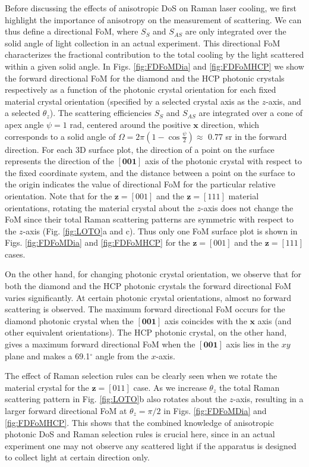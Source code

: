 \documentclass[%
 reprint,
superscriptaddress,
 amsmath,amssymb,
 aps,
pra,
]{revtex4-1}
\newcommand{\mb}[1]{\mathbf{#1}} %
\begin{document}
{Before discussing the effects of anisotropic DoS on Raman laser cooling, we first highlight the importance of anisotropy on the measurement of scattering. We can thus define a directional FoM, where $S_S$ and $S_{AS}$ are only integrated over the solid angle of light collection in an actual experiment. This directional FoM characterizes the fractional contribution to the total cooling by the light scattered within a given solid angle. In Figs.} \ref{fig:FDFoMDia} and \ref{fig:FDFoMHCP} {we show the forward directional FoM for the diamond and the HCP photonic crystals respectively as a function of the photonic crystal orientation for each fixed material crystal orientation (specified by a selected crystal axis as the $z$-axis, and a selected $\theta_z$). The scattering efficiencies $S_S$ and $S_{AS}$ are integrated over a cone of apex angle $\psi=1$ rad, centered around the positive $\mb{x}$ direction, which corresponds to a solid angle of $\Omega=2\pi(1-\cos\frac{\psi}{2})\approx$ 0.77 sr in the forward direction. For each 3D surface plot, the direction of a point on the surface represents the direction of the $[\textbf{001}]$ axis of the photonic crystal with respect to the fixed coordinate system, and the distance between a point on the surface to the origin indicates the value of directional FoM for the particular relative orientation. Note that for the $\mb{z}=[001]$ and the $\mb{z}=[111]$ material orientations, rotating the material crystal about the $z$-axis does not change the FoM since their total Raman scattering patterns are symmetric with respect to the $z$-axis} (Fig. \ref{fig:LOTO}a and c). Thus only one FoM surface plot is shown in Figs. \ref{fig:FDFoMDia} and \ref{fig:FDFoMHCP} for the $\mb{z}=[001]$ and the $\mb{z}=[111]$ cases.






{On the other hand, for changing photonic crystal orientation, we observe that for both the diamond and the HCP photonic crystals the forward directional FoM varies significantly. At certain photonic crystal orientations, almost no forward scattering is observed. The maximum forward directional FoM occurs for the diamond photonic crystal when the $[\textbf{001}]$ axis coincides with the $\mb{x}$ axis (and other equivalent orientations). The HCP photonic crystal, on the other hand, gives a maximum forward directional FoM when the $[\textbf{001}]$ axis lies in the $xy$ plane and makes a 69.1$^\circ$ angle from the $x$-axis.} 


{
The effect of Raman selection rules can be clearly seen when we rotate the material crystal for the $\mb{z}=[011]$ case. As we increase $\theta_z$ the total Raman scattering pattern in Fig.} \ref{fig:LOTO}b also rotates about the $z$-axis, resulting in a larger forward directional FoM at $\theta_z=\pi/2$ in Figs. \ref{fig:FDFoMDia} and \ref{fig:FDFoMHCP}. {This shows that the combined knowledge of anisotropic photonic DoS and Raman selection rules is crucial here, since in an actual experiment one may not observe any scattered light if the apparatus is designed to collect light at certain direction only.}
\end{document}
